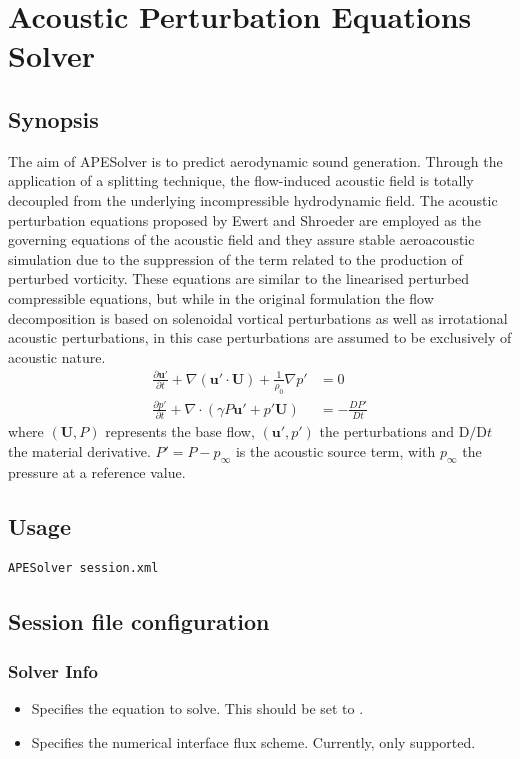 \chapter{Acoustic Perturbation Equations Solver}

\section{Synopsis}
The aim of APESolver is to predict aerodynamic sound generation. Through
the application of a splitting technique, the flow-induced acoustic field is
totally decoupled from the underlying incompressible hydrodynamic field. The
acoustic perturbation equations proposed by Ewert and Shroeder are employed as
the governing equations of the acoustic field and they assure stable
aeroacoustic simulation due to the suppression of the term related to the
production of perturbed vorticity. These equations are similar to the linearised
perturbed compressible equations, but while in the original formulation the flow
decomposition is based on solenoidal vortical perturbations as well as
irrotational acoustic perturbations, in this case perturbations are assumed to
be exclusively of acoustic nature.
\begin{align*}
      \frac{\partial \mathbf{u}'}{\partial t}
        +\nabla(\mathbf{u}' \cdot \mathbf{U})+\frac{1}{\rho_0}\nabla p' &= 0 \\
      \frac{\partial p'}{\partial t}
        +\nabla \cdot (\gamma P \mathbf{u}' + p'\mathbf{U})&=-\frac{DP'}{Dt}
\end{align*}
where $(\mathbf{U},P)$ represents the base flow, $(\mathbf{u}',p')$
the perturbations and $\mathrm{D}/\mathrm{D}t$ the material derivative.
$P'=P-p_{\infty}$ is the acoustic source term, with $p_\infty$
the pressure at a reference value.

\section{Usage}
\begin{lstlisting}[style=BashInputStyle]
APESolver session.xml
\end{lstlisting}

\section{Session file configuration}

\subsection{Solver Info}
\begin{itemize}
\item {} Specifies the equation to solve. This should be set to
.
\item {} Specifies the numerical interface flux scheme.
Currently, only  supported.
\end{itemize}

